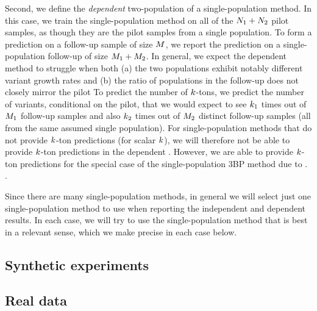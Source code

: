 Second, we define the \emph{dependent} two-population  of a single-population method. In this case, we train the single-population method on all of the $N_{1} +N_{2}$ pilot samples, as though they are the pilot samples from a single population. To form a prediction on a follow-up sample of size $\vecfuturesamplesize$, we report the prediction on a single-population follow-up of size $M_{1} + M_{2}$. 
In general, we expect the dependent method to struggle when both (a) the two populations exhibit notably different variant growth rates and (b) the ratio of populations in the follow-up does not closely mirror the pilot 
To predict the number of $\vecoccurrence$-tons, we predict the number of variants, conditional on the pilot, that we would expect to see $k_{1}$ times out of $M_{1}$ follow-up samples and also $k_{2}$ times out of $M_{2}$ distinct follow-up samples (all from the same assumed single population). For single-population methods that do not provide $k_{}$-ton predictions (for scalar $k_{}$), we will therefore not be able to provide $\vecoccurrence$-ton predictions in the dependent . 
However, we are able to provide $\vecoccurrence$-ton predictions for the special case of the single-population 3BP method due to \citet{Masoero2022}.
.

Since there are many single-population methods, in general we will select just one single-population method to use when reporting the independent and dependent results. In each case, we will try to use the single-population method that is best in a relevant sense, which we make precise in each case below.


\subsection{Synthetic experiments}
\label{sec:simulation}


\subsection{Real data}
\label{sec:real_data}
